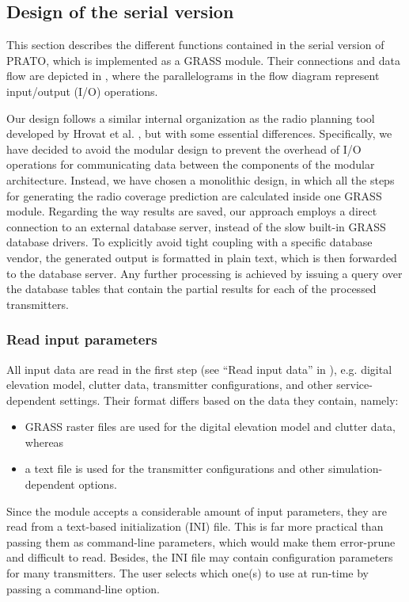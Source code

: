 \subsection{Design of the serial version}

This section describes the different functions contained in the serial
version of PRATO, which is implemented as a GRASS module. Their connections
and data flow are depicted in ,
where the parallelograms in the flow diagram represent input/output
(I/O) operations. 

Our design follows a similar internal organization as the radio planning
tool developed by Hrovat et al. \cite{Ozimek_Open.source.radio.coverage.prediction:2010},
but with some essential differences. Specifically, we have decided
to avoid the modular design to prevent the overhead of I/O operations
for communicating data between the components of the modular architecture.
Instead, we have chosen a monolithic design, in which all the steps
for generating the radio coverage prediction are calculated inside
one GRASS module. Regarding the way results are saved, our approach
employs a direct connection to an external database server, instead
of the slow built-in GRASS database drivers. To explicitly avoid tight
coupling with a specific database vendor, the generated output is
formatted in plain text, which is then forwarded to the database server.
Any further processing is achieved by issuing a query over the database
tables that contain the partial results for each of the processed
transmitters.


\subsubsection{Read input parameters\label{sub:Read-input-parameters}}

All input data are read in the first step (see ``Read input data''
in ), e.g. digital elevation
model, clutter data, transmitter configurations, and other service-dependent
settings. Their format differs based on the data they contain, namely:
\begin{itemize}
\item GRASS raster files are used for the digital elevation model and clutter
data, whereas
\item a text file is used for the transmitter configurations and other simulation-dependent
options.
\end{itemize}
Since the module accepts a considerable amount of input parameters,
they are read from a text-based initialization (INI) file. This is
far more practical than passing them as command-line parameters, which
would make them error-prune and difficult to read. Besides, the INI
file may contain configuration parameters for many transmitters. The
user selects which one(s) to use at run-time by passing a command-line
option.


